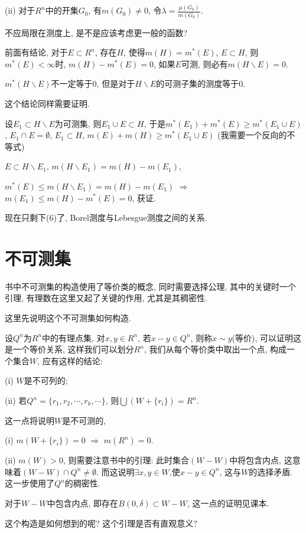 \documentclass[12pt,a4paper,openany]{book}
\begin{document}
(ii) 对于$R^n$中的开集$G_0$, 有$m(G_0) \neq 0$, 令$\lambda = \frac{\mu(G_0)}{m(G_0)}$.

不应局限在测度上, 是不是应该考虑更一般的函数?

前面有结论, 对于$E \subset R^n$, 存在$H$, 使得$m(H) = m^*(E)$, $E \subset H$, 则$m^*(E) < \infty$时, $m(H) -m^*(E) = 0$, 如果$E$可测, 则必有$m(H \backslash E) = 0$.

$m^*(H \backslash E)$不一定等于0, 但是对于$H \backslash E$的可测子集的测度等于0.

这个结论同样需要证明.

设$E_1 \subset H \backslash E$为可测集, 则$E_1 \cup E \subset H$, 于是$m^*(E_1) + m^*(E) \ge m^*(E_1 \cup E)$, $E_1 \cap E = \emptyset$, $E_1 \subset H$, $m(E) + m(H) \ge m^*(E_1 \cup E)$ (我需要一个反向的不等式)

$E \subset H \backslash E_1$, $m(H \backslash E_1) = m(H) - m(E_1)$,

$m^*(E) \le m(H \backslash E_1) = m(H) - m(E_1)$ $\Rightarrow$ $m(E_1) \le m(H) - m^*(E) = 0$, 获证.

现在只剩下(6)了, Borel测度与Lebesgue测度之间的关系.

\section{不可测集}
书中不可测集的构造使用了等价类的概念, 同时需要选择公理, 其中的关键时一个引理, 有理数在这里又起了关键的作用, 尤其是其稠密性.

这里先说明这个不可测集如何构造.

设$Q^n$为$R^n$中的有理点集, 对$x, y \in R^n$, 若$x - y \in Q^n$, 则称$x \sim y$(等价), 可以证明这是一个等价关系, 这样我们可以划分$R^n$, 我们从每个等价类中取出一个点, 构成一个集合$W$, 应有这样的结论:

(i) $W$是不可列的;

(ii) 若$Q^n = \{r_1, r_2, \cdots, r_k, \cdots\}$, 则$\bigcup{(W + \{r_i\})} = R^n$.

这一点将说明$W$是不可测的, 

(i) $m(W + \{r_i\}) = 0$ $\Rightarrow$ $m(R^n) = 0$.

(ii) $m(W) > 0$, 则需要注意书中的引理: 此时集合$(W - W)$中将包含内点, 这意味着$(W - W) \cap Q^n \neq \emptyset$. 而这说明$\exists x, y \in W$,使$x - y \in Q^n$, 这与$W$的选择矛盾. 这一步使用了$Q^n$的稠密性.

对于$W-W$中包含内点, 即存在$B(0, \delta) \subset W-W$, 这一点的证明见课本.

这个构造是如何想到的呢? 这个引理是否有直观意义?
\end{document}
